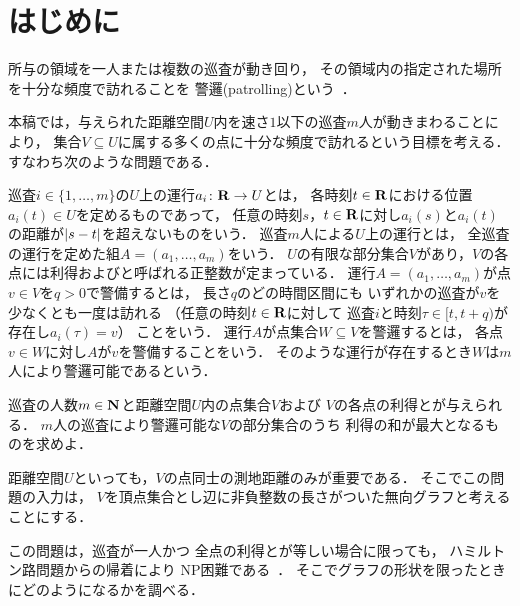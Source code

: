 \section{はじめに}
\label{section: introduction}
所与の領域を一人または複数の巡査が動き回り，
その領域内の指定された場所を十分な頻度で訪れることを
警邏(patrolling)という~\cite{chen2013fence, coene2011charlemagne, czyzowicz2011boundary}．

本稿では，与えられた距離空間$U$内を速さ$1$以下の巡査$m$人が動きまわることにより，
集合$V \subseteq U$に属する多くの点に十分な頻度で訪れるという目標を考える．
すなわち次のような問題である．

巡査$i \in \{1, \ldots, m\}$の$U$上の運行$a _i \colon \mathbf R \to U$とは，
各時刻$t \in \mathbf R$における位置$a _i (t) \in U$を定めるものであって，
任意の時刻$s$，$t \in \mathbf R$に対し$a _i (s)$と$a _i (t)$の距離が$\lvert{s - t}\rvert$を超えないものをいう．
巡査$m$人による$U$上の運行とは，
全巡査の運行を定めた組$A = (a _1, \dots, a _m)$をいう．
$U$の有限な部分集合$V$があり，$V$の各点には利得および{\maxIdletime}と呼ばれる正整数が定まっている．
運行$A = (a _1, \dots, a _m)$が点$v \in V$を{\maxIdletime}$q > 0$で警備するとは，
長さ$q$のどの時間区間にも
いずれかの巡査が$v$を少なくとも一度は訪れる
（任意の時刻$t \in \mathbf R$に対して
巡査$i$と時刻$\tau \in [t, t + q)$が存在し$a _i (\tau) = v$）
ことをいう．
運行$A$が点集合$W \subseteq V$を警邏するとは，
各点$v \in W$に対し$A$が$v$を警備することをいう．
そのような運行が存在するとき$W$は$m$人により警邏可能であるという．

\begin{patrollingProblem}
巡査の人数$m \in \mathbf N$と距離空間$U$内の点集合$V$および
$V$の各点の利得と{\maxIdletime}が与えられる．
$m$人の巡査により警邏可能な$V$の部分集合のうち
利得の和が最大となるものを求めよ．
\end{patrollingProblem}

距離空間$U$といっても，$V$の点同士の測地距離のみが重要である．
そこでこの問題の入力は，
$V$を頂点集合とし辺に非負整数の長さがついた無向グラフと考えることにする．

この問題は，巡査が一人かつ
全点の利得と{\maxIdletime}が等しい場合に限っても，
ハミルトン路問題からの帰着により
NP困難である~\cite[Theorem~8]{coene2011charlemagne}．
そこでグラフの形状を限ったときにどのようになるかを調べる．

